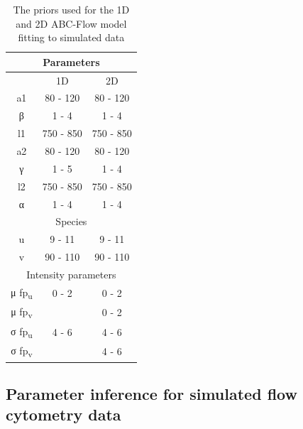 \begin{table}[tb]
\centering
\caption{The priors used for the 1D and 2D ABC-Flow model fitting to simulated data}
\label{tab:priors_model}

\begin{tabular}{@{}ccc@{}}
\toprule
\multicolumn{3}{c}{Parameters}                                         \\ \midrule
\multicolumn{1}{c}{} & \multicolumn{1}{c}{1D} & \multicolumn{1}{c}{2D} \\ \midrule
a1                   & 80 - 120               & 80 - 120               \\
β                   & 1 - 4                  & 1 - 4                  \\
l1                   & 750 - 850              & 750 - 850              \\
a2                   & 80 - 120               & 80 - 120               \\
γ                   & 1 - 5                  & 1 - 4                  \\
l2                   & 750 - 850              & 750 - 850              \\
α                   & 1 - 4                  & 1 - 4                  \\ \midrule
\multicolumn{3}{c}{Species}                                            \\ \midrule
u                    & 9 - 11                 & 9 - 11                 \\
v                    & 90 - 110               & 90 - 110               \\ \midrule
\multicolumn{3}{c}{Intensity parameters}                               \\ \midrule
μ fp\textsubscript{u}             & 0 - 2                  & 0 - 2                  \\
μ fp\textsubscript{v}             &                   & 0 - 2                  \\
σ fp\textsubscript{u}            & 4 - 6                  & 4 - 6                  \\
σ fp\textsubscript{v}            &                   & 4 - 6                  \\ \bottomrule
\end{tabular}

\end{table}




\subsection{Parameter inference for simulated flow cytometry data}

